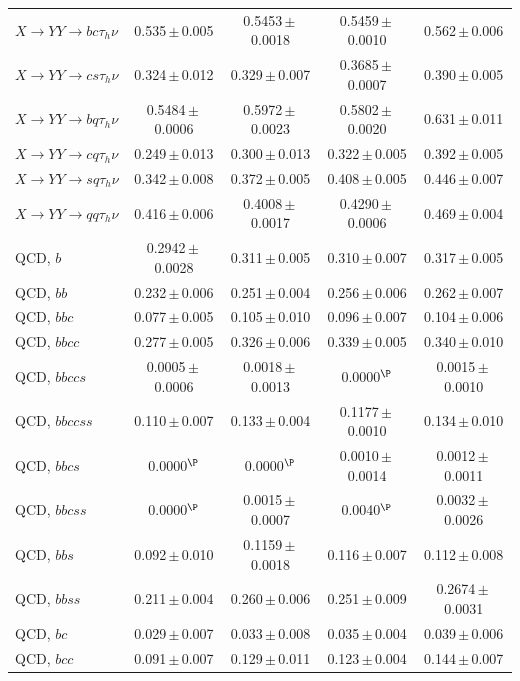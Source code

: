 \begin{landscape}
{\begin{longtable}{@{\extracolsep{\fill}}lcccc@{}}
\midrule
$X\to YY\to bc\tau_h\nu$ & 0.535\,$\pm$\,0.005 & 0.5453\,$\pm$\,0.0018 & 0.5459\,$\pm$\,0.0010 & 0.562\,$\pm$\,0.006 \\
$X\to YY\to cs\tau_h\nu$ & 0.324\,$\pm$\,0.012 & 0.329\,$\pm$\,0.007 & 0.3685\,$\pm$\,0.0007 & 0.390\,$\pm$\,0.005 \\
$X\to YY\to bq\tau_h\nu$ & 0.5484\,$\pm$\,0.0006 & 0.5972\,$\pm$\,0.0023 & 0.5802\,$\pm$\,0.0020 & 0.631\,$\pm$\,0.011 \\
$X\to YY\to cq\tau_h\nu$ & 0.249\,$\pm$\,0.013 & 0.300\,$\pm$\,0.013 & 0.322\,$\pm$\,0.005 & 0.392\,$\pm$\,0.005 \\
$X\to YY\to sq\tau_h\nu$ & 0.342\,$\pm$\,0.008 & 0.372\,$\pm$\,0.005 & 0.408\,$\pm$\,0.005 & 0.446\,$\pm$\,0.007 \\
$X\to YY\to qq\tau_h\nu$ & 0.416\,$\pm$\,0.006 & 0.4008\,$\pm$\,0.0017 & 0.4290\,$\pm$\,0.0006 & 0.469\,$\pm$\,0.004 \\
\midrule
QCD, $b$ & 0.2942\,$\pm$\,0.0028 & 0.311\,$\pm$\,0.005 & 0.310\,$\pm$\,0.007 & 0.317\,$\pm$\,0.005 \\
QCD, $bb$ & 0.232\,$\pm$\,0.006 & 0.251\,$\pm$\,0.004 & 0.256\,$\pm$\,0.006 & 0.262\,$\pm$\,0.007 \\
QCD, $bbc$ & 0.077\,$\pm$\,0.005 & 0.105\,$\pm$\,0.010 & 0.096\,$\pm$\,0.007 & 0.104\,$\pm$\,0.006 \\
QCD, $bbcc$ & 0.277\,$\pm$\,0.005 & 0.326\,$\pm$\,0.006 & 0.339\,$\pm$\,0.005 & 0.340\,$\pm$\,0.010 \\
QCD, $bbccs$ & 0.0005\,$\pm$\,0.0006 & 0.0018\,$\pm$\,0.0013 & 0.0000$^{\P}$ & 0.0015\,$\pm$\,0.0010 \\
QCD, $bbccss$ & 0.110\,$\pm$\,0.007 & 0.133\,$\pm$\,0.004 & 0.1177\,$\pm$\,0.0010 & 0.134\,$\pm$\,0.010 \\
QCD, $bbcs$ & 0.0000$^{\P}$ & 0.0000$^{\P}$ & 0.0010\,$\pm$\,0.0014 & 0.0012\,$\pm$\,0.0011 \\
QCD, $bbcss$ & 0.0000$^{\P}$ & 0.0015\,$\pm$\,0.0007 & 0.0040$^{\P}$ & 0.0032\,$\pm$\,0.0026 \\
QCD, $bbs$ & 0.092\,$\pm$\,0.010 & 0.1159\,$\pm$\,0.0018 & 0.116\,$\pm$\,0.007 & 0.112\,$\pm$\,0.008 \\
QCD, $bbss$ & 0.211\,$\pm$\,0.004 & 0.260\,$\pm$\,0.006 & 0.251\,$\pm$\,0.009 & 0.2674\,$\pm$\,0.0031 \\
QCD, $bc$ & 0.029\,$\pm$\,0.007 & 0.033\,$\pm$\,0.008 & 0.035\,$\pm$\,0.004 & 0.039\,$\pm$\,0.006 \\
QCD, $bcc$ & 0.091\,$\pm$\,0.007 & 0.129\,$\pm$\,0.011 & 0.123\,$\pm$\,0.004 & 0.144\,$\pm$\,0.007 \\

\end{longtable}}
\end{landscape}
